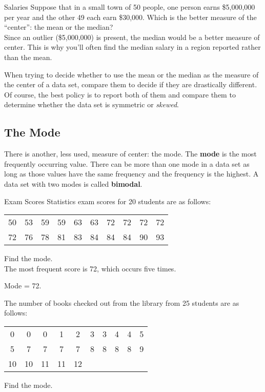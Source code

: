 \begin{example}[https://www.youtube.com/watch?v=INc8CRq3JfA]{Salaries}
Suppose that in a small town of 50 people, one person earns \$5,000,000 per year and the other 49 each earn \$30,000. Which is the better measure of the ``center'': the mean or the median?\\

Since an outlier (\$5,000,000) is present, the median would be a better measure of center.  This is why you'll often find the median salary in a region reported rather than the mean.
\end{example}

When trying to decide whether to use the mean or the median as the measure of the center of a data set, compare them to decide if they are drastically different.  Of course, the best policy is to report both of them and compare them to determine whether the data set is symmetric or \textit{skewed}.

\subsection{The Mode}

There is another, less used, measure of center: the mode. The \textbf{mode} is the most frequently occurring value. There can be more than one mode in a data set as long as those values have the same frequency and the frequency is the highest. A data set with two modes is called \textbf{bimodal}.

\begin{example}[https://www.youtube.com/watch?v=shIDfeUatMU]{Exam Scores}
Statistics exam scores for 20 students are as follows:
\begin{center}
\begin{tabular}{c c c c c c c c c c}
50 & 53 & 59 & 59 & 63 & 63 & 72 & 72 & 72 & 72\\
72 & 76 & 78 & 81 & 83 & 84 & 84 & 84 & 90 & 93
\end{tabular}
\end{center}
Find the mode.\\

The most frequent score is 72, which occurs five times. \begin{center}Mode = 72.\end{center}
\end{example}

\begin{try}
The number of books checked out from the library from 25 students are as follows: 
\begin{center}
\begin{tabular}{c c c c c c c c c c}
0 & 0 & 0 & 1 & 2 & 3 & 3 & 4 & 4 & 5\\
5 & 7 & 7 & 7 & 7 & 8 & 8 & 8 & 8 & 9\\
10 & 10 & 11 & 11 & 12 & & & & &
\end{tabular}
\end{center}
Find the mode.
\end{try}

